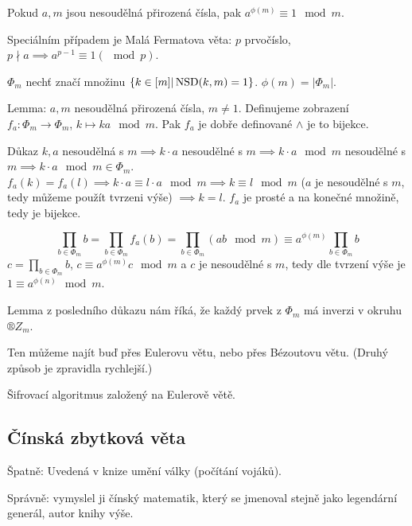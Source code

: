 \documentclass[12pt]{article}                   %
\begin{document}
        \begin{veta}[Eulerova]
            Pokud $a, m$ jsou nesoudělná přirozená čísla, pak $a^{\phi(m)} ≡ 1 \mod m$.

            Speciálním případem je Malá Fermatova věta: $p$ prvočíslo, $p\nmid a \implies a^{p-1}≡1(\mod p)$.

            \begin{dukazin}
                $\Phi_m$ nechť značí množinu $\{k \in [m]|\operatorname{NSD}(k, m) = 1\}$. $\phi(m) = |\Phi_m|$.

                Lemma: $a, m$ nesoudělná přirozená čísla, $m≠1$. Definujeme zobrazení $f_a: \Phi_m \rightarrow \Phi_m$, $k \mapsto ka \mod m$. Pak $f_a$ je dobře definované $\land$ je to bijekce.

                Důkaz $k, a$ nesoudělná s $m \implies k·a$ nesoudělné s $m \implies k·a \mod m$ nesoudělné s $m \implies k·a \mod m \in \Phi_m$. $f_a(k) = f_a(l) \implies k·a ≡ l·a \mod m \implies k≡l \mod m$ ($a$ je nesoudělné s $m$, tedy můžeme použít tvrzeni výše) $\implies k=l$. $f_a$ je prosté a na konečné množině, tedy je bijekce.

                $$ \prod_{b \in \Phi_m}b = \prod_{b \in \Phi_m} f_a(b) = \prod_{b \in \Phi_m} (ab \mod m) ≡ a^{\phi(m)} \prod_{b \in \Phi_m} b $$
                $c = \prod_{b \in \Phi_m} b$, $c ≡ a^{\phi(m)}c \mod m$ a $c$ je nesoudělné s $m$, tedy dle tvrzení výše je $1 ≡ a^{\phi(n)} \mod m$.
            \end{dukazin}
        \end{veta}

        \begin{poznamka}
            Lemma z posledního důkazu nám říká, že každý prvek z $\Phi_m$ má inverzi v okruhu $®Z_m$.

            Ten můžeme najít buď přes Eulerovu větu, nebo přes Bézoutovu větu. (Druhý způsob je zpravidla rychlejší.)
        \end{poznamka}


        \begin{poznamka}
            Šifrovací algoritmus založený na Eulerově větě.
        \end{poznamka}

    \subsection{Čínská zbytková věta}
        \begin{poznamka}
            Špatně: Uvedená v knize umění války (počítání vojáků).

            Správně: vymyslel ji čínský matematik, který se jmenoval stejně jako legendární generál, autor knihy výše.
        \end{poznamka}
\end{document}
